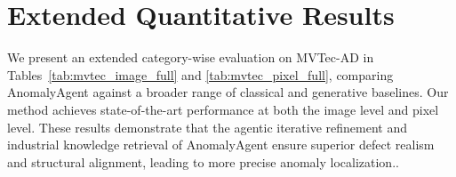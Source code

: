 \documentclass[sigconf]{acmart}
\begin{document}
\noindent\begin{minipage}{\textwidth}

\section{Extended Quantitative Results}


We present an extended category-wise evaluation on MVTec-AD in Tables~\ref{tab:mvtec_image_full} and \ref{tab:mvtec_pixel_full}, comparing AnomalyAgent against a broader range of classical and generative baselines. Our method achieves state-of-the-art performance at both the image level and pixel level. These results demonstrate that the agentic iterative refinement and industrial knowledge retrieval of AnomalyAgent ensure superior defect realism and structural alignment, leading to more precise anomaly localization..

\vspace{2em}  %
\centering
{}
\label{tab:mvtec_image_full}
\setlength{\tabcolsep}{2.2pt} 
\end{minipage}
\end{document}
